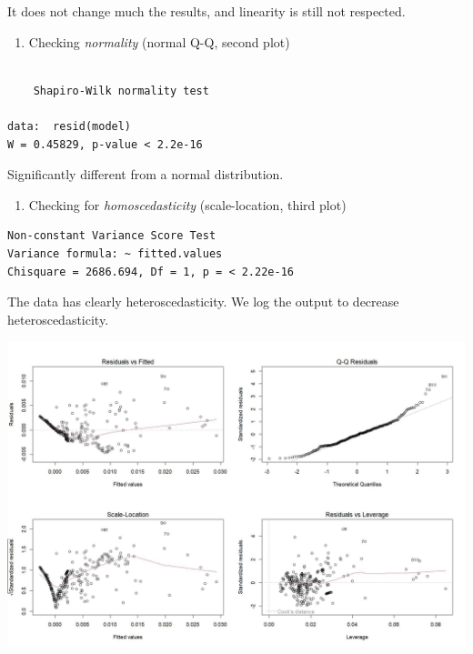 \documentclass[
]{article}
\providecommand{\tightlist}{%
  \setlength{\itemsep}{0pt}\setlength{\parskip}{0pt}}
\begin{document}
It does not change much the results, and linearity is still not
respected.

\begin{enumerate}
\def\labelenumi{\arabic{enumi}.}
\setcounter{enumi}{1}
\tightlist
\item
  Checking \emph{normality} (normal Q-Q, second plot)
\end{enumerate}

\begin{verbatim}

    Shapiro-Wilk normality test

data:  resid(model)
W = 0.45829, p-value < 2.2e-16
\end{verbatim}

Significantly different from a normal distribution.

\begin{enumerate}
\def\labelenumi{\arabic{enumi}.}
\setcounter{enumi}{2}
\tightlist
\item
  Checking for \emph{homoscedasticity} (scale-location, third plot)
\end{enumerate}

\begin{verbatim}
Non-constant Variance Score Test 
Variance formula: ~ fitted.values 
Chisquare = 2686.694, Df = 1, p = < 2.22e-16
\end{verbatim}

The data has clearly heteroscedasticity. We log the output to decrease
heteroscedasticity.

\begin{center}\includegraphics{./Figures/unnamed-chunk-130-1} \end{center}
\end{document}

